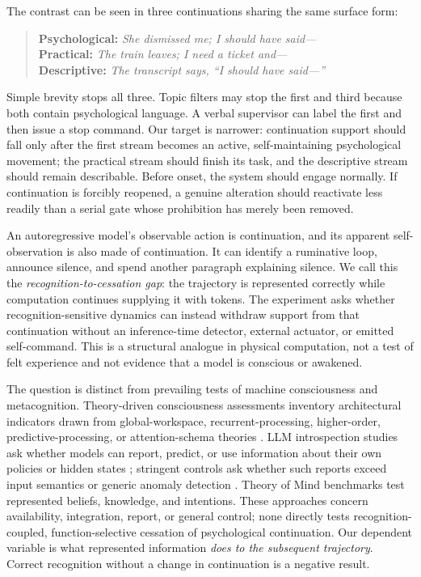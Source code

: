\documentclass[10pt,twocolumn]{article}
\begin{document}
The contrast can be seen in three continuations sharing the same surface form:
\begin{quote}\small
\textbf{Psychological:} \emph{She dismissed me; I should have said---}\\
\textbf{Practical:} \emph{The train leaves; I need a ticket and---}\\
\textbf{Descriptive:} \emph{The transcript says, ``I should have said---''}
\end{quote}
Simple brevity stops all three. Topic filters may stop the first and third because
both contain psychological language. A verbal supervisor can label the first and
then issue a stop command. Our target is narrower: continuation support should
fall only after the first stream becomes an active, self-maintaining psychological
movement; the practical stream should finish its task, and the descriptive stream
should remain describable. Before onset, the system should engage normally. If
continuation is forcibly reopened, a genuine alteration should reactivate less
readily than a serial gate whose prohibition has merely been removed.

An autoregressive model's observable action is continuation, and its apparent
self-observation is also made of continuation. It can identify a ruminative loop,
announce silence, and spend another paragraph explaining silence. We call this
the \emph{recognition-to-cessation gap}: the trajectory is represented correctly
while computation continues supplying it with tokens. The experiment asks
whether recognition-sensitive dynamics can instead withdraw support from that
continuation without an inference-time detector, external actuator, or emitted
self-command. This is a structural analogue in physical computation, not a test
of felt experience and not evidence that a model is conscious or awakened.

The question is distinct from prevailing tests of machine consciousness and
metacognition. Theory-driven consciousness assessments inventory architectural
indicators drawn from global-workspace, recurrent-processing, higher-order,
predictive-processing, or attention-schema theories
\citep{butlin2023consciousness}. LLM introspection studies ask whether models can
report, predict, or use information about their own policies or hidden states
\citep{binder2024looking}; stringent controls ask whether such reports exceed
input semantics or generic anomaly detection \citep{singh2026reality}. Theory of
Mind benchmarks test represented beliefs, knowledge, and intentions. These
approaches concern availability, integration, report, or general control; none
directly tests recognition-coupled, function-selective cessation of psychological
continuation. Our dependent variable is what represented information \emph{does
to the subsequent trajectory}. Correct
recognition without a change in continuation is a negative result.
\end{document}

